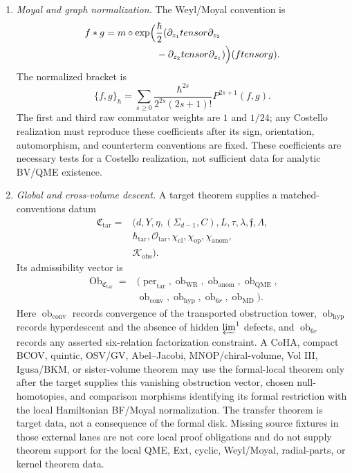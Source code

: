 \begin{enumerate}
  \item \emph{Moyal and graph normalization.}
  The Weyl/Moyal convention is
  \[
    \begin{aligned}
    f*g
    ={}&m\circ\exp\Bigl(\frac{\hbar}{2}
    (\partial_{z_1}\otimes\partial_{z_2}\\
    &\qquad\qquad
     -\partial_{z_2}\otimes\partial_{z_1})\Bigr)(f\otimes g).
    \end{aligned}
  \]
  The normalized bracket is
  \[
    \{f,g\}_\hbar
    =\sum_{s\ge0}
      \frac{\hbar^{2s}}{2^{2s}(2s+1)!}P^{2s+1}(f,g).
  \]
  The first and third raw commutator weights are \(1\) and \(1/24\);
  any Costello realization must reproduce these coefficients after its
  sign, orientation, automorphism, and counterterm conventions are fixed.
  These coefficients are necessary tests for a Costello realization, not
  sufficient data for analytic BV/QME existence.

  \item \emph{Global and cross-volume descent.}
  A target theorem supplies a matched-conventions datum
  \[
    \begin{aligned}
    \mathfrak C_{\mathrm{tar}}
    ={}&(d,Y,\eta,(\Sigma_{d-1},C),L,\tau,\lambda,\mathfrak f,\Lambda,\\
    &\hbar_{\mathrm{tar}},\mathcal O_{\mathrm{tar}},
      \chi_{\mathrm{cl}},\chi_{\mathrm{op}},\chi_{\mathrm{anom}},\\
    &\mathcal K_{\mathrm{obs}}).
    \end{aligned}
  \]
  Its admissibility vector is
  \[
    \begin{aligned}
    \operatorname{Ob}_{\mathfrak C_{\mathrm{tar}}}
    ={}&
    (\operatorname{per}_{\mathrm{tar}},
     \operatorname{ob}_{\mathrm{WR}},
     \operatorname{ob}_{\mathrm{anom}},
     \operatorname{ob}_{\mathrm{QME}},\\
    &\operatorname{ob}_{\mathrm{conv}},
     \operatorname{ob}_{\mathrm{hyp}},
     \operatorname{ob}_{6r},
     \operatorname{ob}_{\mathrm{MD}}).
    \end{aligned}
  \]
  Here \(\operatorname{ob}_{\mathrm{conv}}\) records convergence of the
  transported obstruction tower, \(\operatorname{ob}_{\mathrm{hyp}}\)
  records hyperdescent and the absence of hidden \(\varprojlim^1\)
  defects, and \(\operatorname{ob}_{6r}\) records any asserted
  six-relation factorization constraint.  A CoHA, compact BCOV, quintic,
  OSV/GV, Abel--Jacobi, MNOP/chiral-volume, Vol III, Igusa/BKM, or
  sister-volume theorem may use the formal-local theorem only after the
  target supplies this vanishing obstruction vector, chosen
  null-homotopies, and comparison morphisms identifying its formal
  restriction with the local Hamiltonian BF/Moyal normalization.  The
  transfer theorem is target data, not a consequence of the formal disk.
  Missing source fixtures in those external lanes are not core local
  proof obligations and do not supply theorem support for the local QME,
  Ext, cyclic, Weyl/Moyal, radial-parts, or kernel theorem data.
\end{enumerate}
